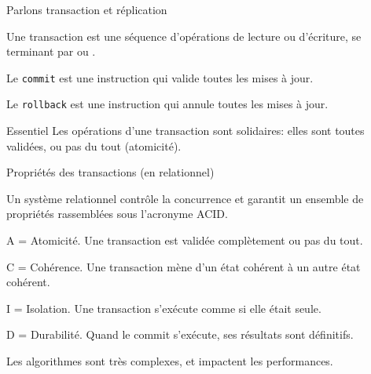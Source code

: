 

\begin{frame}{Parlons transaction et réplication}

Une \alert{transaction} est une séquence d'opérations de \alert{lecture} ou d'\alert{écriture}, 
se terminant par  ou .


\vfill

\begin{redbullet}

  \item   Le \texttt{commit} est une instruction qui \alert{valide} toutes les mises à jour.

  \item Le \texttt{rollback} est une instruction qui \alert{annule} toutes les mises à jour.

\end{redbullet}
\vfill

\begin{remblock}{Essentiel}
Les opérations d'une transaction sont solidaires: elles sont toutes validées, ou pas du tout
(\alert{atomicité}).
\end{remblock}
\end{frame}


\begin{frame}{Propriétés des transactions (en relationnel)}

Un système relationnel contrôle la concurrence et
garantit un ensemble de propriétés rassemblées sous l'acronyme ACID.

\vfill

\begin{redbullet}

  \item  \alert{A = Atomicité}. Une transaction est validée complètement ou pas du tout.
  
  \item  \alert{C = Cohérence}. Une transaction mène d'un état cohérent à un autre état cohérent.
  
  \item \alert{I = Isolation}. Une transaction s'exécute comme si elle était seule.
  
   \item \alert{D = Durabilité}. Quand le commit s'exécute, ses résultats sont définitifs.
\end{redbullet}

\begin{noteblock}
Les algorithmes sont \alert{très} complexes, et impactent les performances.
\end{noteblock}
\end{frame}



